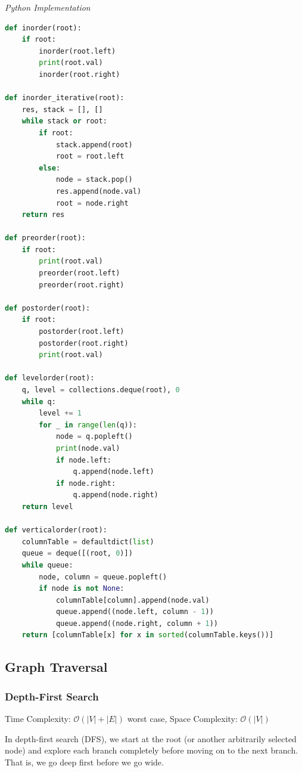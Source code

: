 \documentclass{article}
\newcommand{\bigO}{\mathcal{O}}
\begin{document}
\vspace{8pt} \emph{Python Implementation}
\begin{lstlisting}[language=Python]  
def inorder(root): 
    if root: 
        inorder(root.left) 
        print(root.val)
        inorder(root.right) 

def inorder_iterative(root):
    res, stack = [], [] 
    while stack or root:
        if root:
            stack.append(root)
            root = root.left
        else:
            node = stack.pop()
            res.append(node.val)
            root = node.right
    return res

def preorder(root): 
    if root: 
        print(root.val)
        preorder(root.left) 
        preorder(root.right)

def postorder(root): 
    if root: 
        postorder(root.left) 
        postorder(root.right) 
        print(root.val)

def levelorder(root):
    q, level = collections.deque(root), 0
    while q:
        level += 1
        for _ in range(len(q)):
            node = q.popleft()
            print(node.val)
            if node.left:
                q.append(node.left)
            if node.right:
                q.append(node.right)
    return level
    
def verticalorder(root):
    columnTable = defaultdict(list)
    queue = deque([(root, 0)])
    while queue:
        node, column = queue.popleft()
        if node is not None:
            columnTable[column].append(node.val)
            queue.append((node.left, column - 1))
            queue.append((node.right, column + 1))
    return [columnTable[x] for x in sorted(columnTable.keys())]
\end{lstlisting}
    \subsection{Graph Traversal}

    \subsubsection{Depth-First Search }
    Time Complexity: $\bigO(|V| + |E|)$ worst case, Space Complexity: $\bigO(|V|)$
    
    In depth-first search (DFS), we start at the root (or another arbitrarily selected node) and explore each branch completely before moving on to the next branch. That is, we go deep first before we go wide. 
    
    
\end{document}
